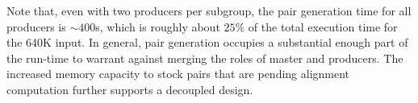 \documentclass[10pt,journal,letterpaper,compsoc]{IEEEtran}
\begin{document}
Note that, even with two producers per subgroup, the pair generation time for all producers is $\sim$$400$s, which is roughly about $25\%$ of the total execution time for the 640K input. In general, pair generation occupies a substantial enough part of the run-time to warrant against merging the roles of master and producers. The increased memory capacity to stock pairs that are pending alignment computation further supports a decoupled design.

\begin{comment}
{\it Andy: I have assumed here that the fraction of the total time (400s) that a producer is idle is negligible. Is this right? On a related note, I can't understand the following: If the idle time for producers during pair generation is negligible AND since there are two producers per subgroup, it implies that almost $50\%$ of the alignment time is pair generation time. Since there are 13 consumers per subgroup, this implies a ratio of 1:26 for pair gen time: pair alignment time. This seems contradicting to our 1:7 assumption. Can you clarify? Does your 1:7 ratio account for time to communicate and if so, as part of which (align or gen)?}
\end{comment}
\end{document}
